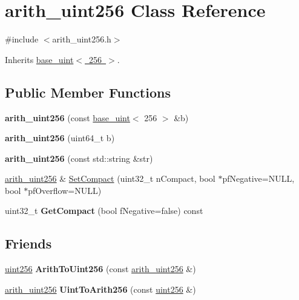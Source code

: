 \hypertarget{classarith__uint256}{}\section{arith\+\_\+uint256 Class Reference}
\label{classarith__uint256}


{\ttfamily \#include $<$arith\+\_\+uint256.\+h$>$}



Inherits \mbox{\hyperlink{classbase__uint}{base\+\_\+uint$<$ 256 $>$}}.

\subsection*{Public Member Functions}
\begin{DoxyCompactItemize}
\item 
\mbox{\label{classarith__uint256_a86c126d261e0edeea49e051e2f3b98a7}} 
{\bfseries arith\+\_\+uint256} (const \mbox{\hyperlink{classbase__uint}{base\+\_\+uint}}$<$ 256 $>$ \&b)
\item 
\mbox{\label{classarith__uint256_a865adeb2767f24e0efc3abfb3d75170b}} 
{\bfseries arith\+\_\+uint256} (uint64\+\_\+t b)
\item 
\mbox{\label{classarith__uint256_a0e8b76f74ffb7a251b15aff89b087fbf}} 
{\bfseries arith\+\_\+uint256} (const std\+::string \&str)
\item 
\mbox{\hyperlink{classarith__uint256}{arith\+\_\+uint256}} \& \mbox{\hyperlink{classarith__uint256_a458133c9f123519646b07e6143f2164f}{Set\+Compact}} (uint32\+\_\+t n\+Compact, bool $\ast$pf\+Negative=N\+U\+LL, bool $\ast$pf\+Overflow=N\+U\+LL)
\item 
\mbox{\label{classarith__uint256_a0eeee9d8f29143ddf1bff2b1ffa8fdc1}} 
uint32\+\_\+t {\bfseries Get\+Compact} (bool f\+Negative=false) const
\end{DoxyCompactItemize}
\subsection*{Friends}
\begin{DoxyCompactItemize}
\item 
\mbox{\label{classarith__uint256_aef075fd8d1a7e5937e9775b8e82c8a1b}} 
\mbox{\hyperlink{classuint256}{uint256}} {\bfseries Arith\+To\+Uint256} (const \mbox{\hyperlink{classarith__uint256}{arith\+\_\+uint256}} \&)
\item 
\mbox{\label{classarith__uint256_a9c9f84c20851f10a8ca5082bec97666a}} 
\mbox{\hyperlink{classarith__uint256}{arith\+\_\+uint256}} {\bfseries Uint\+To\+Arith256} (const \mbox{\hyperlink{classuint256}{uint256}} \&)
\end{DoxyCompactItemize}
